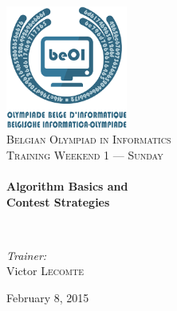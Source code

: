 \begin{titlepage}
\begin{center}

\includegraphics[width=0.3\textwidth]{./img/beoi-logo}~\\[1cm]

\textsc{\LARGE Belgian Olympiad in Informatics}\\[1.5cm]

\textsc{\Large Training Weekend 1 --- Sunday}\\[0.5cm]

\HRule \\[0.4cm]
{ \huge \bfseries Algorithm Basics and \\ Contest Strategies \\[0.4cm] }

\HRule \\[1.5cm]

\begin{center} \large
\emph{Trainer:}\\
Victor \textsc{Lecomte}
\end{center}

\vfill

{\large February 8, 2015}

\end{center}
\end{titlepage}
